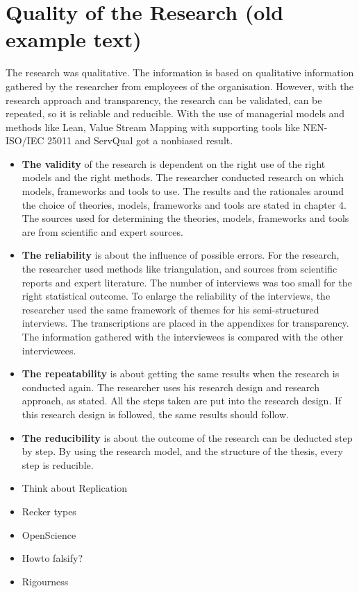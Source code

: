 \section{Quality of the Research (old example text)}
\label{sec:quality-of-the-research}
The research was qualitative. The information is based on qualitative information gathered by the researcher
from employees of the organisation. However, with the research approach and transparency, the research can
be validated, can be repeated, so it is reliable and reducible. With the use of managerial models and methods
like Lean, Value Stream Mapping with supporting tools like NEN-ISO/IEC 25011 and ServQual got a nonbiased
result.\\
\begin{itemize}
	\item{\textbf{The validity} of the research is dependent on the right use of the right models and the right methods. The researcher conducted research on which models, frameworks and tools to use. The results and the rationales around the choice of theories, models, frameworks and tools are stated in chapter 4. The sources used for determining the theories, models, frameworks and tools are from scientific and expert sources.}
	\item{\textbf{The reliability} is about the influence of possible errors. For the research, the researcher used methods like triangulation, and sources from scientific reports and expert literature. The number of interviews was too small for the right statistical outcome. To enlarge the reliability of the interviews, the researcher used the same framework of themes for his semi-structured interviews. The transcriptions are placed in the appendixes for transparency. The information gathered with the interviewees is compared with the other interviewees.}
	\item{\textbf{The repeatability} is about getting the same results when the research is conducted again. The researcher uses his research design and research approach, as stated. All the steps taken are put into the research design. If this research design is followed, the same results should follow.}
	\item{\textbf{The reducibility} is about the outcome of the research can be deducted step by step. By using the research model, and the structure of the thesis, every step is reducible.}
\end{itemize}

\begin{itemize}
	\item{Think about Replication}
	\item{Recker types}
	\item{OpenScience}
	\item{Howto falsify?}
	\item{Rigourness}
\end{itemize}


